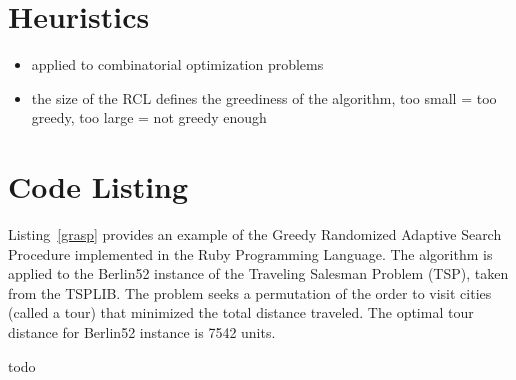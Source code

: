 \documentclass[a4paper, 11pt]{article}
\begin{document}
\section{Heuristics}
\label{sec:heuristics}
\begin{itemize}
	\item applied to combinatorial optimization problems
	\item the size of the RCL defines the greediness of the algorithm, too small = too greedy, too large = not greedy enough
\end{itemize}

\section{Code Listing}
\label{sec:code}
Listing~\ref{grasp} provides an example of the Greedy Randomized Adaptive Search Procedure implemented in the Ruby Programming Language. 
The algorithm is applied to the Berlin52 instance of the Traveling Salesman Problem (TSP), taken from the TSPLIB. The problem seeks a permutation of the order to visit cities (called a tour) that minimized the total distance traveled. The optimal tour distance for Berlin52 instance is 7542 units.

todo




\end{document}
